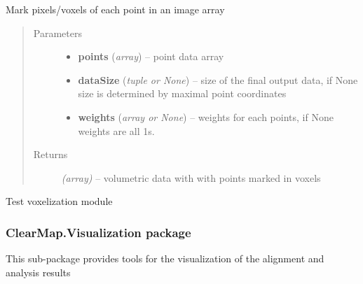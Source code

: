 \documentclass[letterpaper,10pt,english]{sphinxmanual}
\begin{document}
\begin{fulllineitems}
\label{api/ClearMap.Analysis:ClearMap.Analysis.Voxelization.voxelizePixel}
Mark pixels/voxels of each point in an image array
\begin{quote}\begin{description}
\item[{Parameters}] \leavevmode\begin{itemize}
\item {} 
\textbf{points} (\emph{array}) --
point data array

\item {} 
\textbf{dataSize} (\emph{tuple or None}) --
size of the final output data, if None size is determined by maximal point coordinates

\item {} 
\textbf{weights} (\emph{array or None}) --
weights for each points, if None weights are all 1s.

\end{itemize}

\item[{Returns}] \leavevmode
\emph{(array)} --
volumetric data with with points marked in voxels

\end{description}\end{quote}

\end{fulllineitems}


\begin{fulllineitems}
\label{api/ClearMap.Analysis:ClearMap.Analysis.Voxelization.test}
Test voxelization module

\end{fulllineitems}



\subsubsection{ClearMap.Visualization package}
\label{api/ClearMap.Visualization:module-ClearMap.Visualization}\label{api/ClearMap.Visualization::doc}\label{api/ClearMap.Visualization:clearmap-visualization-package}
This sub-package provides tools for the visualization of the alignment and
analysis results
\end{document}
